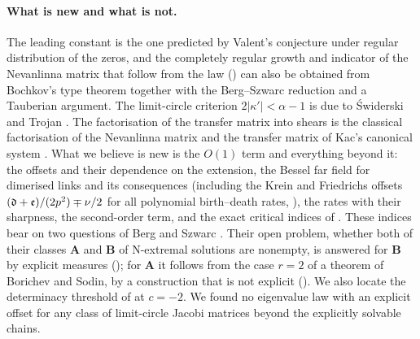 \paragraph{What is new and what is not.} The leading constant is the one predicted by
Valent's conjecture under regular distribution of the zeros, and the completely regular
growth and indicator of the Nevanlinna matrix that follow from the law ()
can also be obtained from Bochkov's type theorem together with the Berg--Szwarc reduction
and a Tauberian argument. The limit-circle criterion $2|\kappa'|<\alpha-1$ is due to \'Swiderski
and Trojan \cite{SwiderskiTrojan2022}. The factorisation of the transfer matrix into shears
is the classical factorisation of the Nevanlinna matrix and the transfer matrix of Kac's
canonical system \cite{Kac1999}. What we believe is new is the $O(1)$ term and everything
beyond it: the offsets and their dependence on the extension, the Bessel far field for
dimerised links and its consequences (including the Krein and Friedrichs offsets
$(\mathfrak d+\mathfrak e)/(2p^2)\mp\nu/2$ for all polynomial birth--death rates, ), the rates with
their sharpness, the second-order term, and the exact critical indices of .
These indices bear on two questions of Berg and Szwarc \cite{BergSzwarc2026}. Their open problem, whether both of their classes $\mathbf A$ and $\mathbf B$ of N-extremal solutions
are nonempty, is answered for $\mathbf B$ by explicit measures (); for $\mathbf A$ it follows from the
case $r=2$ of a theorem of Borichev and Sodin, by a construction that is not explicit
(). We also locate the determinacy threshold of \cite[Ex.~4.1]{BergSzwarc2026} at
$c=-2$. We found no eigenvalue law with an explicit offset for any class of limit-circle Jacobi
matrices beyond the explicitly solvable chains.

